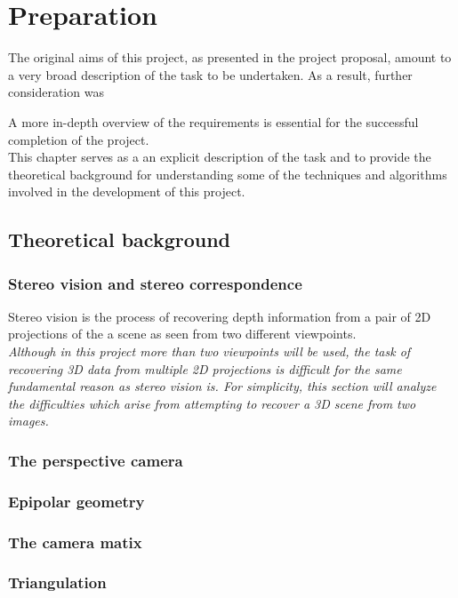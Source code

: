 \documentclass[12pt,a4paper,twoside,openright]{report}
\begin{document}
\chapter{Preparation}
The original aims of this project, as presented in the project proposal, amount to a very broad description of the task to be undertaken. As a result, further consideration was  

A more in-depth overview of the requirements is essential for the successful completion of the project.\\  
This chapter serves as a 
an explicit description of the task and to provide the theoretical background for understanding some of the techniques and algorithms involved in the development of this project.

\section{Theoretical background}
\subsection{Stereo vision and stereo correspondence}
Stereo vision is the process of recovering depth information from a pair of 2D projections of the a scene as seen from two different viewpoints.\\ 
\textit{Although in this project more than two viewpoints will be used, the task of recovering 3D data from multiple 2D projections is difficult for the same fundamental reason as stereo vision is. For simplicity, this section will analyze the difficulties which arise from attempting to recover a 3D scene from two images.} \\

\subsection{The perspective camera}


\subsection{Epipolar geometry}

\subsection{The camera matix}

\subsection{Triangulation}
\end{document}
